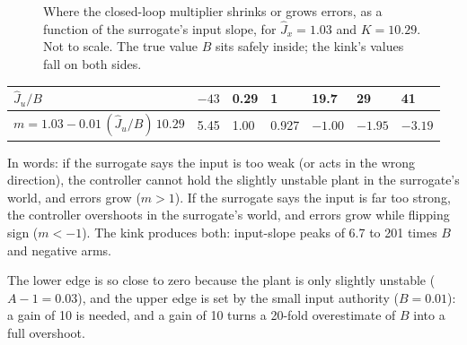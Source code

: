 \documentclass[11pt]{article}
\begin{document}
\begin{figure}[H]
\centering
{}
\caption{Where the closed-loop multiplier shrinks or grows errors, as a function of the surrogate's input slope, for $\hat J_x=1.03$ and $K=10.29$. Not to scale. The true value $B$ sits safely inside; the kink's values fall on both sides.}
\end{figure}

\begin{center}
\begin{tabular}{lllllll}
\toprule
$\hat J_u/B$ & $-43$ & 0.29 & 1 & 19.7 & 29 & 41 \\
\midrule
$m=1.03-0.01\,(\hat J_u/B)\,10.29$ & 5.45 & 1.00 & 0.927 & $-1.00$ & $-1.95$ & $-3.19$ \\
\bottomrule
\end{tabular}
\end{center}

In words: if the surrogate says the input is too weak (or acts in the wrong direction), the controller cannot hold the slightly unstable plant in the surrogate's world, and errors grow ($m>1$). If the surrogate says the input is far too strong, the controller overshoots in the surrogate's world, and errors grow while flipping sign ($m<-1$). The kink produces both: input-slope peaks of 6.7 to 201 times $B$ and negative arms.

The lower edge is so close to zero because the plant is only slightly unstable ($A-1=0.03$), and the upper edge is set by the small input authority ($B=0.01$): a gain of 10 is needed, and a gain of 10 turns a 20-fold overestimate of $B$ into a full overshoot.
\end{document}
